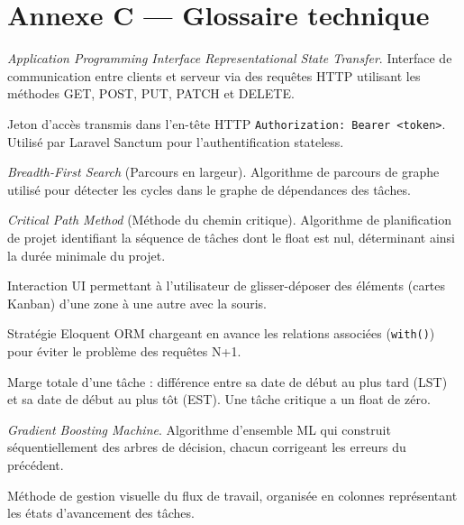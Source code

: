 \chapter{Annexe C — Glossaire technique}

\begin{description}[leftmargin=3.5cm,style=nextline]

  \item[API REST]
    \textit{Application Programming Interface Representational State Transfer}.
    Interface de communication entre clients et serveur via des requêtes HTTP
    utilisant les méthodes GET, POST, PUT, PATCH et DELETE.

  \item[Bearer Token]
    Jeton d'accès transmis dans l'en-tête HTTP \texttt{Authorization: Bearer <token>}.
    Utilisé par Laravel Sanctum pour l'authentification stateless.

  \item[BFS]
    \textit{Breadth-First Search} (Parcours en largeur). Algorithme de parcours de
    graphe utilisé pour détecter les cycles dans le graphe de dépendances des tâches.

  \item[CPM]
    \textit{Critical Path Method} (Méthode du chemin critique). Algorithme de
    planification de projet identifiant la séquence de tâches dont le float est
    nul, déterminant ainsi la durée minimale du projet.

  \item[Drag-and-drop]
    Interaction UI permettant à l'utilisateur de glisser-déposer des éléments
    (cartes Kanban) d'une zone à une autre avec la souris.

  \item[Eager Loading]
    Stratégie Eloquent ORM chargeant en avance les relations associées
    (\texttt{with()}) pour éviter le problème des requêtes N+1.

  \item[Float (CPM)]
    Marge totale d'une tâche : différence entre sa date de début au plus tard (LST)
    et sa date de début au plus tôt (EST). Une tâche critique a un float de zéro.

  \item[GBM]
    \textit{Gradient Boosting Machine}. Algorithme d'ensemble ML qui construit
    séquentiellement des arbres de décision, chacun corrigeant les erreurs du
    précédent.

  \item[Kanban]
    Méthode de gestion visuelle du flux de travail, organisée en colonnes
    représentant les états d'avancement des tâches.


\end{description}
